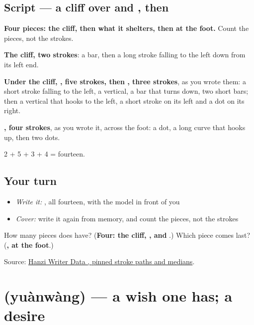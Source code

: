 \subsection*{Script — a cliff over  and , then }

\begin{quote}
\end{quote}

\textbf{Four pieces: the cliff, then what it shelters, then  at the foot.} Count the pieces, not the strokes.

\textbf{The cliff, two strokes}: a bar, then a long stroke falling to the left down from its left end.

\textbf{Under the cliff, , five strokes, then , three strokes}, as you wrote them: a short stroke falling to the left, a vertical, a bar that turns down, two short bars; then a vertical that hooks to the left, a short stroke on its left and a dot on its right.

\textbf{, four strokes}, as you wrote it, across the foot: a dot, a long curve that hooks up, then two dots.

2 + 5 + 3 + 4 = fourteen.

\subsection*{Your turn}
\begin{itemize}
\raggedright
  \item \emph{Write it:} , all fourteen, with the model in front of you
  \item \emph{Cover:} write it again from memory, and count the pieces, not the strokes
\end{itemize}

\begin{tcolorbox}[breakable,colback=teal!4,colframe=teal!35!black,title={Before you move on}]
How many pieces does  have? (\textbf{Four: the cliff, ,  and }.) Which piece comes last? (\textbf{, at the foot}.)

Source: \href{https://raw.githubusercontent.com/chanind/hanzi-writer-data/68d10a4b21150cae5e1ebbd223eed289cf32d90c/data/\%E6\%84\%BF.json}{Hanzi Writer Data , pinned stroke paths and medians}.
\end{tcolorbox}
\section[\texorpdfstring{\zh{愿望} (yuànwàng)}{愿望 (yuànwàng)}]{ (yuànwàng) — a wish one has; a desire}


